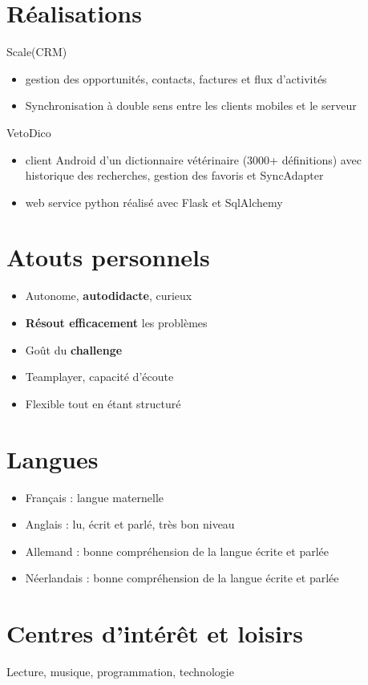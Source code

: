 \documentclass[11pt, a4paper]{moderncv}
\begin{document}
\section{Réalisations}
\cvitem
{Scale(CRM)}
{
	\begin{itemize}
		\item gestion des opportunités, contacts, factures et flux d’activités
		\item Synchronisation à double sens entre les clients mobiles et le serveur
	\end{itemize} 
}
\cvitem
{VetoDico}
{
	\begin{itemize}
		\item client Android d’un dictionnaire vétérinaire (3000+ définitions) avec historique des recherches, gestion des favoris et SyncAdapter
		\item web service python réalisé avec Flask et SqlAlchemy
	\end{itemize}
}

\section{Atouts personnels}
	\begin{itemize}
		\item Autonome, \textbf{autodidacte}, curieux
		\item \textbf{Résout efficacement} les problèmes
		\item Goût du \textbf{challenge}
		\item Teamplayer, capacité d’écoute
		\item Flexible tout en étant structuré
	\end{itemize}
		
\section{Langues}
	\begin{itemize}
		\item Français : langue maternelle
		\item Anglais : lu, écrit et parlé, très bon niveau 
		\item Allemand : bonne compréhension de la langue écrite et parlée
		\item Néerlandais : bonne compréhension de la langue écrite et parlée 
	\end{itemize}


\section{Centres d’intérêt et loisirs}
		Lecture, musique, programmation, technologie
\end{document}

